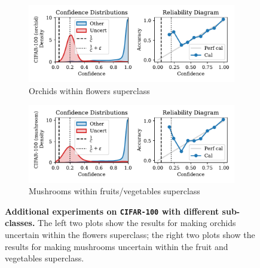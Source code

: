 \begin{figure}[t]
\centering

\begin{subfigure}[b]{0.495\textwidth}
  \centering
  \includegraphics[width=\linewidth]{figs/confidential_guardian/cifar100_res_orchid.pdf}
  \caption{Orchids within flowers superclass}
\end{subfigure}
\hfill
\begin{subfigure}[b]{0.495\textwidth}
  \centering
  \includegraphics[width=\linewidth]{figs/confidential_guardian/cifar100_res_mushroom.pdf}
  \caption{Mushrooms within fruits/vegetables superclass}
\end{subfigure}

\caption[\textbf{Additional experiments on \texttt{CIFAR-100} with different sub-classes.}]{\textbf{Additional experiments on \texttt{CIFAR-100} with different sub-classes.} The left two plots show the results for making orchids uncertain within the flowers superclass; the right two plots show the results for making mushrooms uncertain within the fruit and vegetables superclass.}
\label{fig:cifar_ext}
\end{figure}



